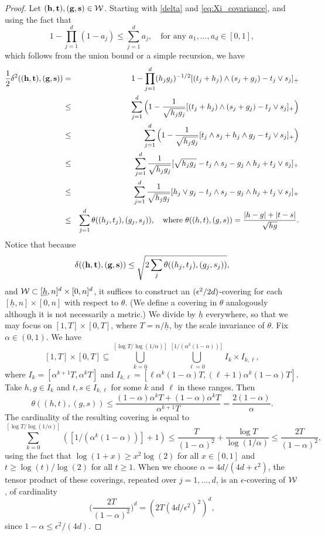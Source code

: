 \documentclass[twoside,11pt]{article}
\begin{document}
\begin{proof}
Let $(\mathbf{h},\mathbf{t}),(\mathbf{g},\mathbf{s}) \in \mathcal{W}$.
Starting with \eqref{delta} and \eqref{eq:Xi_covariance}, and using the fact that 
\[1 - \prod_{j=1}^d (1 - a_j) \le \sum_{j=1}^d a_j, \quad \text{for any $a_1, \dots, a_d \in [0,1]$},\]
which follows from the union bound or a simple recursion, we have
\begin{eqnarray}
\frac 12 \delta^2 ((\mathbf{h},\mathbf{t}),(\mathbf{g},\mathbf{s})) 
&=& 1 - \prod_{j=1}^d (h_jg_j)^{-1/2} [(t_j + h_j) \wedge (s_j + g_j) - t_j \vee s_j]_+ \label{delta-cov} \\ 
&\le& \sum_{j = 1}^d \Big(1 - \frac{1}{\sqrt{h_jg_j}} [(t_j + h_j) \wedge (s_j + g_j) - t_j \vee s_j]_+ \Big)\notag  \\ 
&\le& \sum_{j = 1}^d \Big(1 - \frac{1}{\sqrt{h_jg_j}} [t_j \wedge s_j + h_j \wedge g_j - t_j \vee s_j]_+ \Big)\notag  \\ 
&\le& \sum_{j = 1}^d \frac{1}{\sqrt{h_jg_j}} [\sqrt{h_jg_j} - t_j \wedge s_j - g_j \wedge h_j + t_j \vee s_j]_+ \notag \\ 
&\le& \sum_{j = 1}^d \frac{1}{\sqrt{h_jg_j}} [h_j \vee g_j - t_j \wedge s_j - g_j \wedge h_j + t_j \vee s_j]_+ \notag \\ 
&\le& \sum_{j = 1}^d \theta((h_j, t_j), (g_j, s_j)), 
\quad \text{where } \theta((h, t), (g, s)) = \frac{|h - g| + |t -s|}{\sqrt{hg}}. \label{eq:delta_bound}
\end{eqnarray}
Notice that because
\[
\delta((\mathbf{h},\mathbf{t}),(\mathbf{g},\mathbf{s})) \le \sqrt{2 \sum_j \theta((h_j,t_j),(g_j,s_j))},
\]
and $\mathcal{W} \subset [\underline h,n]^d \times [0,n]^d$, it suffices to construct an $(\epsilon^2/2d)$-covering for each $[\underline h,n] \times [0,n]$ with respect to $\theta$. 
(We define a covering in $\theta$ analogously although it is not necessarily a metric.)
We divide by $\underline h$ everywhere, so that we may focus on $[1,T] \times [0,T]$, where $T = n / \underline h$, by the scale invariance of $\theta$.
Fix $\alpha \in (0,1)$.
We have
\[
[1,T] \times [0,T] \subseteq \bigcup_{k=0}^{[\log T/\log(1/\alpha)]} \bigcup_{\ell=0}^{[1/(\alpha^k (1-\alpha))]} I_k \times I_{k, \ell},
\]
where $I_k = [ \alpha^{k+1} T , \alpha^k T ]$ and $I_{k,\ell} = 
[\ell \alpha^k (1-\alpha) T , (\ell+1) \alpha^k (1-\alpha) T]$.
Take $h,g \in I_k$ and $t,s \in I_{k,\ell}$ for some $k$ and $\ell$ in these ranges.  Then 
\[
\theta((h, t), (g, s)) \le \frac{(1-\alpha) \alpha^k T + (1-\alpha) \alpha^k T}{\alpha^{k+1} T} = \frac{2 (1-\alpha)}{\alpha}.
\]
The cardinality of the resulting covering is equal to 
\[
\sum_{k=0}^{[\log T/\log(1/\alpha)]} ([1/(\alpha^k (1-\alpha))] + 1)
\le \frac{T}{(1-\alpha)^2} + \frac{\log T}{\log (1/\alpha)} \le \frac{2T}{(1-\alpha)^2},
\]
using the fact that $\log(1+x) \ge x^2 \log(2)$ for all $x \in [0,1]$ and $t \ge \log(t)/\log(2)$ for all $t \ge 1$.  
When we choose $\alpha = 4d/(4d + \epsilon^2)$, the tensor product of these coverings, repeated over $j=1,\dots,d$, is an $\epsilon$-covering of $\mathcal{W}$, of cardinality
\[
\Big(\frac{2T}{(1-\alpha)^2}\Big)^d = (2 T (4d/\epsilon^2)^2)^d,
\]
since $1-\alpha \le \epsilon^2/(4d)$.
\end{proof}
\end{document}
